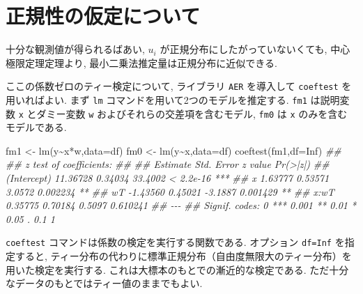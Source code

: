 \documentclass[
  letterpaper,
  xelatex,
  ja=standard, xelatex]{bxjsbook}
\newenvironment{Shaded}{\begin{snugshade}}{\end{snugshade}}
\newcommand{\AttributeTok}[1]{\textcolor[rgb]{0.40,0.45,0.13}{#1}}
\newcommand{\ConstantTok}[1]{\textcolor[rgb]{0.56,0.35,0.01}{#1}}
\newcommand{\DocumentationTok}[1]{\textcolor[rgb]{0.37,0.37,0.37}{\textit{#1}}}
\newcommand{\FunctionTok}[1]{\textcolor[rgb]{0.28,0.35,0.67}{#1}}
\newcommand{\NormalTok}[1]{\textcolor[rgb]{0.00,0.23,0.31}{#1}}
\newcommand{\OtherTok}[1]{\textcolor[rgb]{0.00,0.23,0.31}{#1}}
\newcommand{\SpecialCharTok}[1]{\textcolor[rgb]{0.37,0.37,0.37}{#1}}
\begin{document}
\section{正規性の仮定について}\label{ux6b63ux898fux6027ux306eux4eeeux5b9aux306bux3064ux3044ux3066}

十分な観測値が得られるばあい, \(u_i\)
が正規分布にしたがっていないくても, 中心極限定理定理より,
最小二乗法推定量は正規分布に近似できる.

ここの係数ゼロのティー検定について, ライブラリ \texttt{AER} を導入して
\texttt{coeftest} を用いればよい. まず \texttt{lm}
コマンドを用いて2つのモデルを推定する. \texttt{fm1} は説明変数
\texttt{x} とダミー変数 \texttt{w} およびそれらの交差項を含むモデル,
\texttt{fm0} は \texttt{x} のみを含むモデルである.

\begin{Shaded}
\begin{Highlighting}[]
\NormalTok{fm1 }\OtherTok{\textless{}{-}} \FunctionTok{lm}\NormalTok{(y}\SpecialCharTok{\textasciitilde{}}\NormalTok{x}\SpecialCharTok{*}\NormalTok{w,}\AttributeTok{data=}\NormalTok{df)}
\NormalTok{fm0 }\OtherTok{\textless{}{-}} \FunctionTok{lm}\NormalTok{(y}\SpecialCharTok{\textasciitilde{}}\NormalTok{x,}\AttributeTok{data=}\NormalTok{df)}
\FunctionTok{coeftest}\NormalTok{(fm1,}\AttributeTok{df=}\ConstantTok{Inf}\NormalTok{)}
\DocumentationTok{\#\# }
\DocumentationTok{\#\# z test of coefficients:}
\DocumentationTok{\#\# }
\DocumentationTok{\#\#             Estimate Std. Error z value  Pr(\textgreater{}|z|)    }
\DocumentationTok{\#\# (Intercept) 11.36728    0.34034 33.4002 \textless{} 2.2e{-}16 ***}
\DocumentationTok{\#\# x            1.63777    0.53571  3.0572  0.002234 ** }
\DocumentationTok{\#\# wT          {-}1.43560    0.45021 {-}3.1887  0.001429 ** }
\DocumentationTok{\#\# x:wT         0.35775    0.70184  0.5097  0.610241    }
\DocumentationTok{\#\# {-}{-}{-}}
\DocumentationTok{\#\# Signif. codes:  0 \textquotesingle{}***\textquotesingle{} 0.001 \textquotesingle{}**\textquotesingle{} 0.01 \textquotesingle{}*\textquotesingle{} 0.05 \textquotesingle{}.\textquotesingle{} 0.1 \textquotesingle{} \textquotesingle{} 1}
\end{Highlighting}
\end{Shaded}

\texttt{coeftest} コマンドは係数の検定を実行する関数である. オプション
\texttt{df=Inf} を指定すると,
ティー分布の代わりに標準正規分布（自由度無限大のティー分布）を用いた検定を実行する.
これは大標本のもとでの漸近的な検定である.
ただ十分なデータのもとではティー値のままでもよい.
\end{document}
